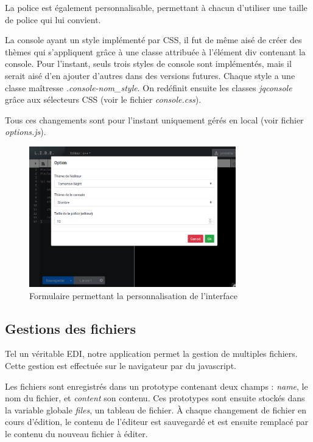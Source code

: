 La police est également personnalisable, permettant à chacun d'utiliser une taille de police qui lui convient.

La console ayant un style implémenté par CSS, il fut de même aisé de créer des thèmes qui s'appliquent grâce à une classe attribuée à l'élément div contenant la console. Pour l'instant, seuls trois styles de console sont implémentés, mais il serait aisé d'en ajouter d'autres dans des versions futures. Chaque style a une classe maîtresse \emph{.console-nom\_style}. On redéfinit ensuite les classes \emph{jqconsole} grâce aux sélecteurs CSS (voir le fichier \emph{console.css}).

Tous ces changements sont pour l'instant uniquement gérés en local (voir fichier \emph{options.js}).

\begin{figure}[!h]
\centering
\includegraphics[width=0.8\textwidth]{./img/frontend/example_personnalisation.png}
\caption{Formulaire permettant la personnalisation de l'interface}
\end{figure}

\subsection{Gestions des fichiers}
Tel un véritable EDI, notre application permet la gestion de multiples fichiers. Cette gestion est effectuée sur le navigateur par du javascript.

Les fichiers sont enregistrés dans un prototype contenant deux champs : \emph{name}, le nom du fichier, et \emph{content} son contenu. Ces prototypes sont ensuite stockés dans la variable globale \emph{files}, un tableau de fichier. À chaque changement de fichier en cours d'édition, le contenu de l'éditeur est sauvegardé et est ensuite remplacé par le contenu du nouveau fichier à éditer.

